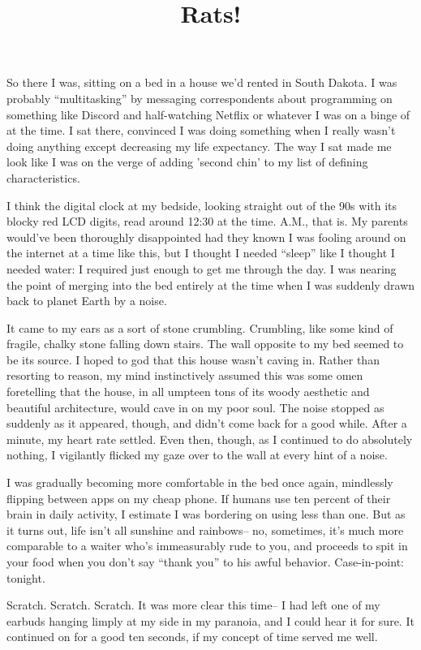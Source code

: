\documentclass[12pt]{article}
\title{Rats!}
\begin{document}
\makeheader
\hspace{0.5in}
So there I was, sitting on a bed in a house we'd rented in South Dakota.  I was probably ``multitasking'' by messaging correspondents about programming on something like Discord and half-watching Netflix or whatever I was on a binge of at the time.  I sat there, convinced I was doing something when I really wasn't doing anything except decreasing my life expectancy.  The way I sat made me look like I was on the verge of adding 'second chin' to my list of defining characteristics.

I think the digital clock at my bedside, looking straight out of the 90s with its blocky red LCD digits, read around 12:30 at the time.  A.M., that is.  My parents would've been thoroughly disappointed had they known I was fooling around on the internet at a time like this, but I thought I needed ``sleep'' like I thought I needed water:  I required just enough to get me through the day.  I was nearing the point of merging into the bed entirely at the time when I was suddenly drawn back to planet Earth by a noise.

It came to my ears as a sort of stone crumbling.  Crumbling, like some kind of fragile, chalky stone falling down stairs.  The wall opposite to my bed seemed to be its source.  I hoped to god that this house wasn't caving in.  Rather than resorting to reason, my mind instinctively assumed this was some omen foretelling that the house, in all umpteen tons of its woody aesthetic and beautiful architecture, would cave in on my poor soul.  The noise stopped as suddenly as it appeared, though, and didn't come back for a good while.  After a minute, my heart rate settled.  Even then, though, as I continued to do absolutely nothing, I vigilantly flicked my gaze over to the wall at every hint of a noise.

I was gradually becoming more comfortable in the bed once again, mindlessly flipping between apps on my cheap phone.  If humans use ten percent of their brain in daily activity, I estimate I was bordering on using less than one.  But as it turns out, life isn't all sunshine and rainbows-- no, sometimes, it's much more comparable to a waiter who's immeasurably rude to you, and proceeds to spit in your food when you don't say ``thank you'' to his awful behavior.  Case-in-point:  tonight.

Scratch.  Scratch.  Scratch.  It was more clear this time-- I had left one of my earbuds hanging limply at my side in my paranoia, and I could hear it for sure.  It continued on for a good ten seconds, if my concept of time served me well.
\end{document}
